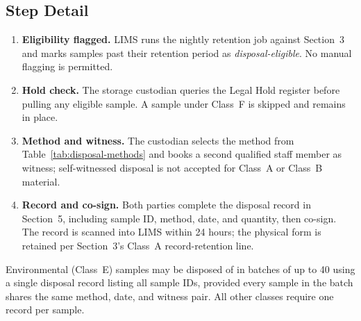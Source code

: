 \begin{center}
\end{center}

\subsection{Step Detail}
\begin{enumerate}
  \item \textbf{Eligibility flagged.} LIMS runs the nightly retention job against
        Section~3 and marks samples past their retention period as \emph{disposal-eligible}.
        No manual flagging is permitted.
  \item \textbf{Hold check.} The storage custodian queries the Legal Hold register before
        pulling any eligible sample. A sample under Class~F is skipped and remains in place.
  \item \textbf{Method and witness.} The custodian selects the method from
        Table~\ref{tab:disposal-methods} and books a second qualified staff member as witness;
        self-witnessed disposal is not accepted for Class~A or Class~B material.
  \item \textbf{Record and co-sign.} Both parties complete the disposal record in Section~5,
        including sample ID, method, date, and quantity, then co-sign. The record is scanned
        into LIMS within 24 hours; the physical form is retained per Section~3's Class~A
        record-retention line.
\end{enumerate}

\begin{noticebox}
Environmental (Class~E) samples may be disposed of in batches of up to 40 using a single
disposal record listing all sample IDs, provided every sample in the batch shares the same
method, date, and witness pair. All other classes require one record per sample.
\end{noticebox}
